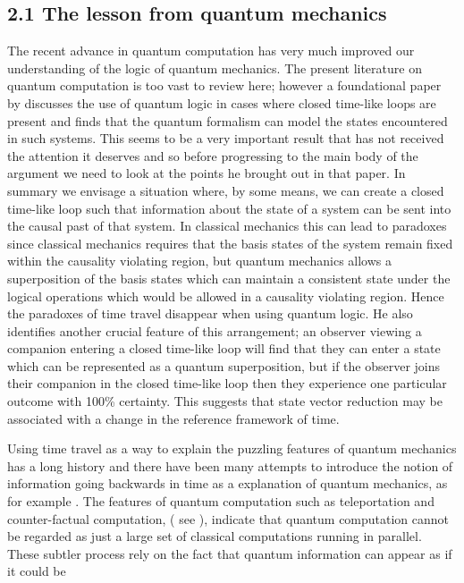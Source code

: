 \documentclass[
   ,final            %
  ]
  {aipproc}
\begin{document}
\subsection{2.1 The lesson from quantum mechanics }
\par
The recent advance in quantum computation has very much improved our understanding of the logic
of quantum mechanics. The present literature on quantum computation is too vast to review here; however a foundational
paper by \citet{Deutsch_91} discusses the use of quantum logic in cases where closed time-like loops are present
and finds that the quantum formalism can model the states encountered in such systems. This seems to be a very important result that has not received %
the attention it deserves and so before progressing to the main body of the argument we need to look at the points he brought out in that paper. In %
summary we envisage a situation where, by some means, we can create a closed time-like loop such that information about the state of a system can be %
sent into the causal past of that system. In classical mechanics this can lead to paradoxes since classical mechanics requires that the basis states %
of the system remain fixed within the causality violating region, but quantum mechanics allows a superposition of the basis states which can maintain %
a consistent state under the logical operations which would be allowed in a causality violating region. Hence the paradoxes of time travel disappear %
when using quantum logic. He also identifies another crucial feature of this arrangement; an observer viewing a companion entering a closed time-like %
loop will find that they can enter a state which can be represented as a quantum superposition, but if the observer joins their companion in the %
closed time-like loop then they experience one particular outcome with 100\% certainty. This suggests that state vector reduction may be associated %
with a change in the reference framework of time.
\par
Using time travel as a way to explain the puzzling features of quantum mechanics has a long history and there have been many attempts to introduce the %
notion of information going backwards in
time as a explanation of quantum mechanics, as for example \citet{Aharonov_64,Cramer_jg,Hadley}. The features of quantum computation such as %
teleportation and counter-factual computation, ( see \citet{mitcheson_jozsa_2001}), indicate that quantum computation cannot be regarded as just a %
large set of classical computations running in parallel. These subtler process rely on the fact that quantum information can appear as if it could be %
\end{document}
